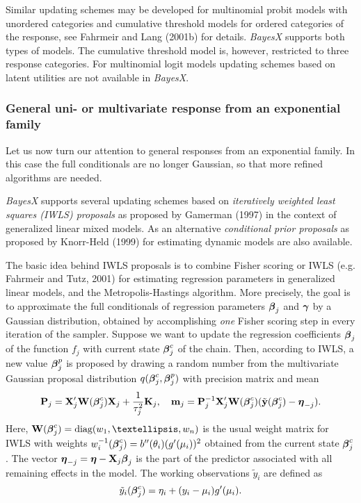 \documentclass[11pt,a4paper,twoside]{bayesxarticle}
\begin{document}
Similar updating schemes may be developed for multinomial probit
models with unordered categories and cumulative threshold models for
ordered categories of the response, see Fahrmeir and Lang (2001b)
for details. {\em BayesX} supports both types of models. The
cumulative threshold model is, however, restricted to three response
categories. For multinomial logit models updating schemes based on
latent utilities are not available in {\em BayesX}.

\subsubsection{General uni- or multivariate response from an exponential family}
\label{IWLS} 

Let us now turn our attention to general responses from an
exponential family. In this case the full conditionals are no longer
Gaussian, so that more refined algorithms are needed.

{\em BayesX} supports several updating schemes based on {\em
iteratively weighted least squares (IWLS) proposals} as proposed by
Gamerman (1997) in the context of generalized linear mixed models.
As an alternative {\em conditional prior proposals} as proposed by
Knorr-Held (1999) for estimating dynamic models are also available.

The basic idea behind IWLS proposals is to combine Fisher scoring
or IWLS (e.g. Fahrmeir and Tutz, 2001) for estimating regression
parameters in generalized linear models, and the
Metropolis-Hastings algorithm. More precisely, the goal is to
approximate the full conditionals of regression parameters
$\boldsymbol{\beta}_j$ and $\boldsymbol{\gamma}$ by a Gaussian distribution, obtained by
accomplishing {\em one} Fisher scoring step in every iteration of
the sampler. Suppose we want to update the regression coefficients
$\boldsymbol{\beta}_j$ of the  function $f_j$ with current state $\boldsymbol{\beta}_j^c$ of
the chain. Then, according to IWLS, a new value $\boldsymbol{\beta}_j^p$ is
proposed by drawing a random number from the multivariate Gaussian
proposal distribution $q(\boldsymbol{\beta}_j^c,\boldsymbol{\beta}_j^p)$ with precision
matrix and mean
\begin{equation}
\label{prec} \Pvec_j = \Xvec_j'\Wvec(\betavec^c_j)\Xvec_j + \frac{1}{\tau^2_j} \Kvec_j,
\quad \mvec_j = \Pvec_j^{-1}\Xvec_j'\Wvec(\betavec^c_j)(\tilde{\yvec}(\betavec^c_j) -
\etavec_{-j}).
\end{equation}
Here, $\Wvec(\betavec^c_j) = \diag(w_1,\dots,w_n)$ is the usual weight
matrix for IWLS with weights $w^{-1}_i(\boldsymbol{\beta}^c_j) =
b''(\theta_i)(g'(\mu_i))^2$ obtained from the current state
$\boldsymbol{\beta}^c_j$. The vector $\boldsymbol{\eta}_{-j}=\boldsymbol{\eta}-\mathbf{X}_j\boldsymbol{\beta}_j$ is the part of
the predictor associated with all remaining effects in the model.
The working observations $\tilde{y}_i$ are defined as
$$\tilde{y}_i(\boldsymbol{\beta}^c_j) = \eta_i + (y_i - \mu_i)g'(\mu_i).$$
\end{document}
